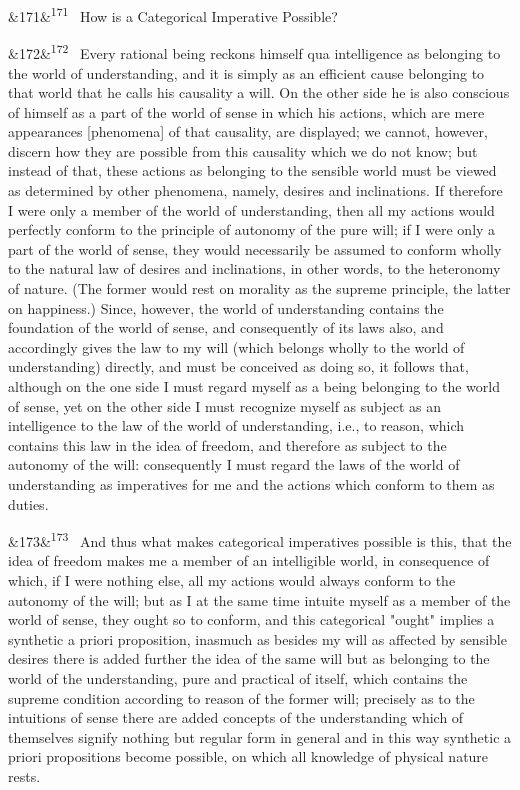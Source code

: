 \documentclass[12pt]{article}
\newcommand{\para}[1][]{\par\noindent\ifx&#1&\else\textsuperscript{\footnotesize #1}~\fi}
\begin{document}
\para[171] How is a Categorical Imperative Possible?

\para[172] Every rational being reckons himself qua intelligence as belonging to the world of understanding, and it is simply as an efficient cause belonging to that world that he calls his causality a will. On the other side he is also conscious of himself as a part of the world of sense in which his actions, which are mere appearances [phenomena] of that causality, are displayed; we cannot, however, discern how they are possible from this causality which we do not know; but instead of that, these actions as belonging to the sensible world must be viewed as determined by other phenomena, namely, desires and inclinations. If therefore I were only a member of the world of understanding, then all my actions would perfectly conform to the principle of autonomy of the pure will; if I were only a part of the world of sense, they would necessarily be assumed to conform wholly to the natural law of desires and inclinations, in other words, to the heteronomy of nature. (The former would rest on morality as the supreme principle, the latter on happiness.) Since, however, the world of understanding contains the foundation of the world of sense, and consequently of its laws also, and accordingly gives the law to my will (which belongs wholly to the world of understanding) directly, and must be conceived as doing so, it follows that, although on the one side I must regard myself as a being belonging to the world of sense, yet on the other side I must recognize myself as subject as an intelligence to the law of the world of understanding, i.e., to reason, which contains this law in the idea of freedom, and therefore as subject to the autonomy of the will: consequently I must regard the laws of the world of understanding as imperatives for me and the actions which conform to them as duties.

\para[173] And thus what makes categorical imperatives possible is this, that the idea of freedom makes me a member of an intelligible world, in consequence of which, if I were nothing else, all my actions would always conform to the autonomy of the will; but as I at the same time intuite myself as a member of the world of sense, they ought so to conform, and this categorical "ought" implies a synthetic a priori proposition, inasmuch as besides my will as affected by sensible desires there is added further the idea of the same will but as belonging to the world of the understanding, pure and practical of itself, which contains the supreme condition according to reason of the former will; precisely as to the intuitions of sense there are added concepts of the understanding which of themselves signify nothing but regular form in general and in this way synthetic a priori propositions become possible, on which all knowledge of physical nature rests.
\end{document}
